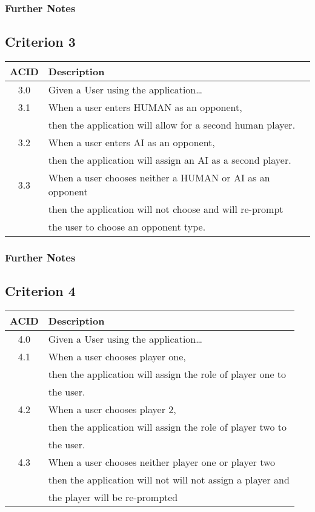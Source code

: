 \documentclass[11pt]{article}
\begin{document}
\subsubsection*{Further Notes}
\label{sec:org18acd18}
\subsection{Criterion 3}
\label{sec:org7f1416b}
\begin{center}
\begin{tabular}{|c|l|}
ACID & Description\\
\hline
3.0 & Given a User using the application\ldots{}\\
\hline
3.1 & When a user enters HUMAN as an opponent,\\
 & then the application will allow for a second human player.\\
3.2 & When a user enters AI as an opponent,\\
 & then the application will assign an AI as a second player.\\
3.3 & When a user chooses neither a HUMAN or AI as an opponent\\
 & then the application will not choose and will re-prompt\\
 & the user to choose an opponent type.\\
\end{tabular}
\end{center}

\subsubsection*{Further Notes}
\label{sec:orgfd58e1c}

\subsection{Criterion 4}
\label{sec:orga5e9373}
\begin{center}
\begin{tabular}{|c|l|}
ACID & Description\\
\hline
4.0 & Given a User using the application\ldots{}\\
\hline
4.1 & When a user chooses player one,\\
 & then the application will assign the role of player one to\\
 & the user.\\
4.2 & When a user chooses player 2,\\
 & then the application will assign the role of player two to\\
 & the user.\\
4.3 & When a user chooses neither player one or player two\\
 & then the application will not will not assign a player and\\
 & the player will be re-prompted\\
\end{tabular}
\end{center}
\end{document}
